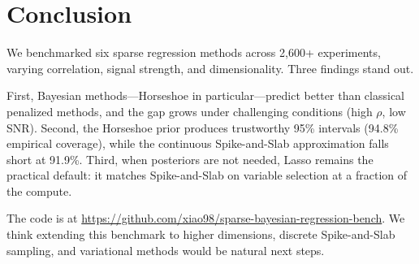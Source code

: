 \section{Conclusion}
\label{sec:conclusion}

We benchmarked six sparse regression methods across 2{,}600+ experiments, varying correlation, signal strength, and dimensionality.
Three findings stand out.

First, Bayesian methods---Horseshoe in particular---predict better than classical penalized methods, and the gap grows under challenging conditions (high $\rho$, low SNR).
Second, the Horseshoe prior produces trustworthy 95\% intervals (94.8\% empirical coverage), while the continuous Spike-and-Slab approximation falls short at 91.9\%.
Third, when posteriors are not needed, Lasso remains the practical default: it matches Spike-and-Slab on variable selection at a fraction of the compute.

The code is at \url{https://github.com/xiao98/sparse-bayesian-regression-bench}.
We think extending this benchmark to higher dimensions, discrete Spike-and-Slab sampling, and variational methods would be natural next steps.
